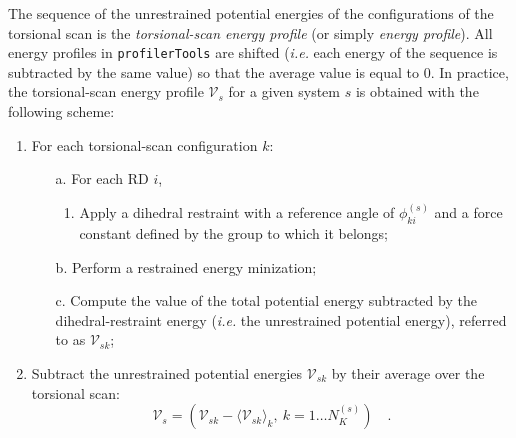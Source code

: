 \documentclass[10pt,a4paper,openany]{memoir}
\numberwithin{equation}{section}
\newcommand{\profilertools}[0]{\texttt{profilerTools}}
\begin{document}
The sequence of the unrestrained potential energies of the
configurations of the torsional scan is the \textit{torsional-scan
  energy profile} (or simply \textit{energy profile}).  All energy
profiles in \profilertools{} are shifted (\textit{i.e.} each energy of
the sequence is subtracted by the same value) so that the average
value is equal to 0.
In practice, the torsional-scan energy profile $\mathcal{V}_s$ for a
given system $s$ is obtained with the following scheme:
\begin{enumerate}
\item For each torsional-scan configuration $k$:
  \begin{enumerate}
  \item[a.] For each RD $i$,
    \begin{enumerate}
    \item Apply a dihedral restraint with a reference angle of
      $\phi_{ki}^{(s)}$ and a force constant defined by the group to
      which it belongs;
  \end{enumerate}
\item [b.] Perform a restrained energy minization;
  \item [c.] Compute the value of the total potential energy
    subtracted by the dihedral-restraint energy (\textit{i.e.} the
    unrestrained potential energy), referred to as $\mathcal{V}_{sk}$;
\end{enumerate}
\item Subtract the unrestrained potential energies
  $\mathcal{V}_{sk}$ by their average over the torsional scan:
  \begin{equation}
  \label{eq:ga-tors-scan}
  \mathcal{V}_s = \left( \mathcal{V}_{sk} - \langle {\mathcal{V}_{sk} \rangle_k},\ k=1\ldots N_K^{(s)} \right) \quad .
\end{equation}
\end{enumerate}
\end{document}
